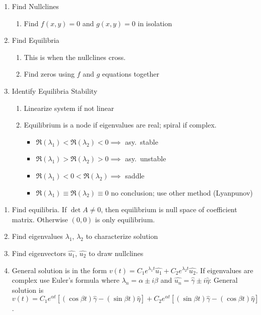 \item[Two-Dimensional Nonlinear Systems] \hfill
  \begin{enumerate}
  \item Find Nullclines
    \begin{enumerate}
    \item Find $f(x,y)=0$ and $g(x,y)=0$ in isolation
    \end{enumerate}
  \item Find Equilibria
    \begin{enumerate}
    \item This is when the nullclines cross.
    \item Find zeros using $f$ and $g$ equations together
    \end{enumerate}
  \item Identify Equilibria Stability
    \begin{enumerate}
    \item Linearize system if not linear
    \item Equilibrium is a node if eigenvalues are real; spiral if complex.
      \begin{itemize}
      \item $\Re(\lambda_1) < \Re(\lambda_2) < 0 \implies$ asy.\ stable
      \item $\Re(\lambda_1) > \Re(\lambda_2) > 0 \implies$ asy.\ unstable
      \item $\Re(\lambda_1) < 0 < \Re(\lambda_2) \implies$ saddle
      \item $\Re(\lambda_1) \equiv \Re(\lambda_2) \equiv 0$ no conclusion; use
        other method (Lyanpunov)
      \end{itemize}
    \end{enumerate}
  \end{enumerate}

\item[Two-Dimensional Linear Systems] \hfill
  \begin{enumerate}
  \item Find equilibria. If $\det A\ne0$, then equilibrium is null space of
    coefficient matrix. Otherwise $(0,0)$ is only equilibrium.
  \item Find eigenvalues $\lambda_1$, $\lambda_2$ to characterize solution
  \item Find eigenvectors $\hat{u_1}$, $\hat{u_2}$ to draw nullclines
  \item General solution is in the form $v(t)=C_1e^{\lambda_1
      t}\hat{u_1}+C_2e^{\lambda_2 t}\hat{u_2}$. If eigenvalues are complex use
    Euler's formula where $\lambda_n=\alpha\pm i\beta$ and
    $\hat{u_n}=\hat{\gamma}\pm i\hat{\eta}$: General solution is $v(t) =
    C_1e^{\alpha t}[(\cos\beta t)\hat{\gamma} - (\sin\beta t)\hat{\eta}] +
    C_2e^{\alpha t}[(\sin\beta t)\hat{\gamma} - (\cos\beta t)\hat{\eta}]$.
  \end{enumerate}

